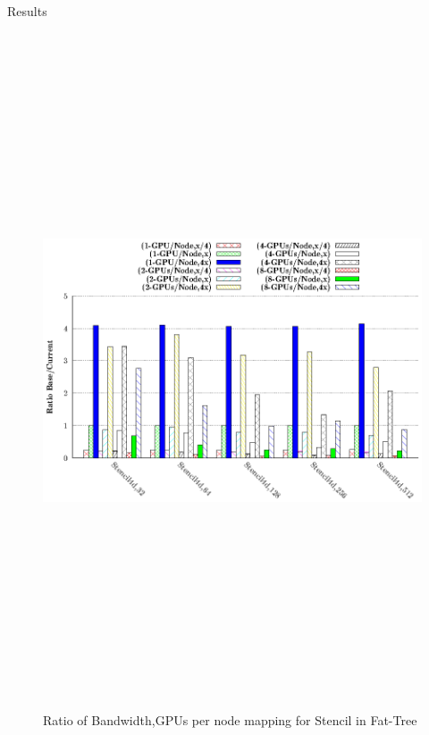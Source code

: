 \documentclass[final]{beamer}
\newlength{\onecolwid}
\newlength{\twocolwid}
\begin{document}
\begin{frame}[t]
\begin{columns}[t]
\begin{column}{\twocolwid}
\begin{columns}[t,totalwidth=\twocolwid]
\begin{column}{\onecolwid}
\begin{block}{Results}
\begin{figure}
\centering
\begin{minipage}{1\textwidth}
\centering
\includegraphics[width=1\linewidth, height=20cm]{figs/ftree-bw-mapping-comm-stencil.eps}
\captionsetup{labelformat=empty}
\caption{Ratio of Bandwidth,GPUs per node mapping for Stencil in Fat-Tree}
\end{minipage}
\end{figure}

\end{block}


\end{column} %


\end{columns}
\end{column}
\end{columns}
\end{frame}
\end{document}
